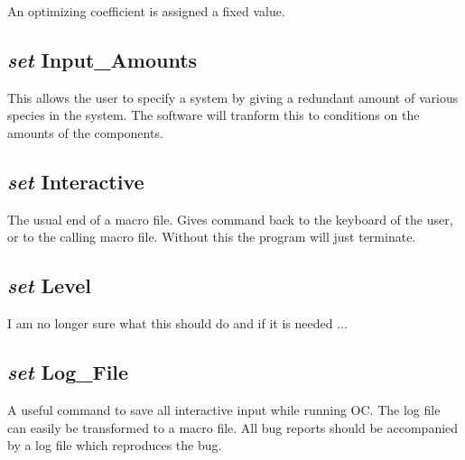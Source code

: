 \documentclass[12pt]{article}
\begin{document}
An optimizing coefficient is assigned a fixed value.

\subsection{{\em set} Input\_Amounts}

This allows the user to specify a system by giving a redundant amount
of various species in the system.  The software will tranform this to
conditions on the amounts of the components.

\subsection{{\em set} Interactive}

The usual end of a macro file.  Gives command back to the keyboard of
the user, or to the calling macro file.  Without this the program will
just terminate.

\subsection{{\em set} Level}

I am no longer sure what this should do and if it is needed ...

\subsection{{\em set} Log\_File}

A useful command to save all interactive input while running OC.  The
log file can easily be transformed to a macro file.  All bug reports
should be accompanied by a log file which reproduces the bug.
\end{document}

